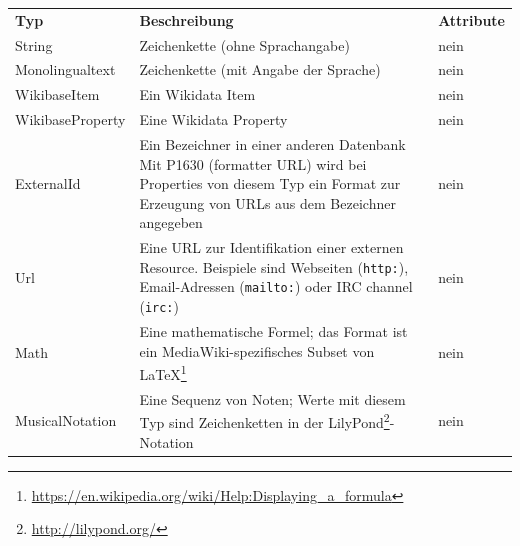 \begin{table}
  \setlength{\extrarowheight}{0.1cm}
  \begin{adjustwidth}{-1.5cm}{-0.5cm}
    \begin{minipage}{\textwidth}
    \begin{tabular}{l p{} p{}}
      \setlength{\parfillskip}{0pt}
      \bfseries{Typ}   & \bfseries{Beschreibung}                                                                                                                                       & \bfseries{Attribute} \\
      String           & Zeichenkette (ohne Sprachangabe)                                                                                                                              & nein \\
      Monolingualtext  & Zeichenkette (mit Angabe der Sprache)                                                                                                                         & nein \\
      WikibaseItem     & Ein Wikidata Item                                                                                                                                             & nein \\
      WikibaseProperty & Eine Wikidata Property                                                                                                                                        & nein \\
      ExternalId       & Ein Bezeichner in einer anderen Datenbank\newline{}
                         Mit P1630 (formatter URL) wird bei Properties von diesem Typ ein Format zur Erzeugung von URLs aus dem Bezeichner angegeben                                   & nein \\
      Url              & Eine URL zur Identifikation einer externen Resource. Beispiele sind Webseiten (\verb|http:|), Email-Adressen (\verb|mailto:|) oder IRC channel (\verb|irc:|)  & nein \\
      Math             & Eine mathematische Formel; das Format ist ein MediaWiki-spezifisches Subset von \LaTeX\footnote{\url{https://en.wikipedia.org/wiki/Help:Displaying_a_formula}}& nein \\
      MusicalNotation  & Eine Sequenz von Noten; Werte mit diesem Typ sind Zeichenketten in der LilyPond\footnote{\url{http://lilypond.org/}}-Notation                                 & nein \\

\end{tabular}
\end{minipage}
\end{adjustwidth}
\end{table}
